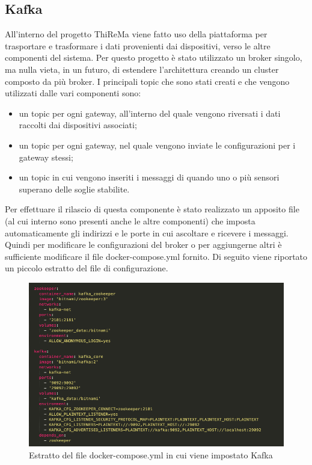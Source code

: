 \subsection{Kafka}
	All'interno del progetto ThiReMa viene fatto uso della piattaforma  per trasportare e trasformare i dati provenienti dai dispositivi, verso le altre componenti del sistema.
	\newline
	Per questo progetto è stato utilizzato un broker singolo, ma nulla vieta, in un futuro, di estendere l'architettura creando un cluster composto da più broker.
	\newline
	\newline
	I principali topic che sono stati creati e che vengono utilizzati dalle vari componenti sono:
	\begin{itemize}
		\item un topic per ogni gateway, all'interno del quale vengono riversati i dati raccolti dai dispositivi associati;
		\item un topic per ogni gateway, nel quale vengono inviate le configurazioni per i gateway stessi;
		\item un topic in cui vengono inseriti i messaggi di  quando uno o più sensori superano delle 
		soglie stabilite.
	\end{itemize}
	Per effettuare il rilascio di questa componente è stato realizzato un apposito file  (al cui interno sono presenti anche le altre componenti) che imposta automaticamente gli indirizzi e le porte in cui ascoltare e ricevere i messaggi. Quindi per modificare le configurazioni del broker  o per aggiungerne altri è sufficiente modificare il file docker-compose.yml fornito.
	\newline
	Di seguito viene riportato un piccolo estratto del file di configurazione.

		\begin{figure}[H]
			\centering
			\includegraphics[scale=0.470]{res/images/estrattoKafka_dockerCompose.png}
			\caption{Estratto del file docker-compose.yml in cui viene impostato Kafka}
			\label{Immagine 1}
		\end{figure}
	\pagebreak
